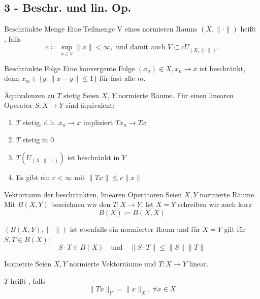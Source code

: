 \subsection*{3 - Beschr. und lin. Op.}

	\begin{karte}{Beschränkte Menge}
		Eine Teilmenge V eines normieren Raums $(X, \| \cdot \|)$ hei{\ss}t , falls 
		\[ c \coloneqq \sup_{x \in V} \| x \| < \infty, \text{ und damit auch } V \subset c U_{(X, \| \cdot \| )} . \]
	\end{karte}
	
	\begin{karte}{Beschränkte Folge}
		Eine konvergente Folge $(x_{n})	\in X, x_{n} \rightarrow x$ ist beschränkt, denn $x_{m} \in \{ y: \| x - y \| \leq 1 \}$ für fast alle $m$.
	\end{karte}	
	
	\begin{karte}{Äquivalenzen zu $T$ stetig}
		Seien $X$, $Y$ normierte Räume. Für einen linearen Operator $S: X \rightarrow Y$ sind äquivalent:
		\begin{enumerate}[label=\alph*\upshape)]
			\item $T$ stetig, d.h. $x_{n} \rightarrow x$ impliziert $Tx_{n} \rightarrow Tx$
			\item $T$ stetig in 0
			\item $T(U_{(X, \| \cdot \|)})$ ist beschränkt in $Y$
			\item Es gibt ein $c < \infty$ mit $\| Tx \| \leq c \| x \|$
		\end{enumerate}
	\end{karte}	
	
	\begin{karte}{Vektorraum der beschränkten, linearen Operatoren}
		Seien $X, Y$ normierte Räume. Mit $B(X, Y)$ bezeichnen wir den  $T: X \rightarrow Y$. Ist $ X = Y$ schreiben wir auch kurz 
			\[ B(X) \coloneqq B(X, X) \]
		
			$(B(X, Y), \| \cdot \|)$ ist ebenfalls ein normierter Raum und für $X = Y$ gilt für $S, T \in B(X)$:
 		\[ S \cdot T \in B(X) \quad \text{und} \quad \| S \cdotp T \| \leq \| S \| \| T \| \]
	\end{karte}
	
	\begin{karte}{Isometrie}
		Seien $X, Y$ normierte Vektorräume und $T: X \rightarrow Y$ linear.
	
		$T$ hei{\ss}t , falls 
			\[ \| Tx \|_{Y} = \| x \|_{X}, ~ \forall x \in X \]
	\end{karte}
	
